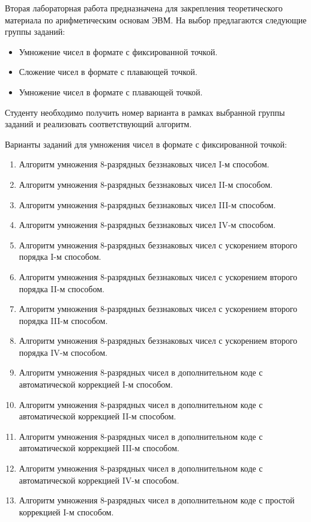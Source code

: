 Вторая лабораторная работа предназначена для закрепления теоретического материала по арифметическим основам ЭВМ. 
На выбор предлагаются следующие группы заданий:
\begin{itemize}
    \item Умножение чисел в формате с фиксированной точкой.
    \item Сложение чисел в формате с плавающей точкой.
    \item Умножение чисел в формате с плавающей точкой.
\end{itemize}

Студенту необходимо получить номер варианта в рамках выбранной группы заданий и реализовать соответствующий алгоритм.

Варианты заданий для умножения чисел в формате с фиксированной точкой:
\begin{enumerate}
    \item Алгоритм умножения 8-разрядных беззнаковых чисел I-м способом.
    \item Алгоритм умножения 8-разрядных беззнаковых чисел II-м способом.
    \item Алгоритм умножения 8-разрядных беззнаковых чисел III-м способом.
    \item Алгоритм умножения 8-разрядных беззнаковых чисел IV-м способом.
    \item Алгоритм умножения 8-разрядных беззнаковых чисел с ускорением второго порядка I-м способом.
    \item Алгоритм умножения 8-разрядных беззнаковых чисел с ускорением второго порядка II-м способом.
    \item Алгоритм умножения 8-разрядных беззнаковых чисел с ускорением второго порядка III-м способом.
    \item Алгоритм умножения 8-разрядных беззнаковых чисел с ускорением второго порядка IV-м способом.
    \item Алгоритм умножения 8-разрядных чисел в дополнительном коде с автоматической коррекцией I-м способом.
    \item Алгоритм умножения 8-разрядных чисел в дополнительном коде с автоматической коррекцией II-м способом.
    \item Алгоритм умножения 8-разрядных чисел в дополнительном коде с автоматической коррекцией III-м способом.
    \item Алгоритм умножения 8-разрядных чисел в дополнительном коде с автоматической коррекцией IV-м способом.
    \item Алгоритм умножения 8-разрядных чисел в дополнительном коде с простой коррекцией I-м способом.

\end{enumerate}
